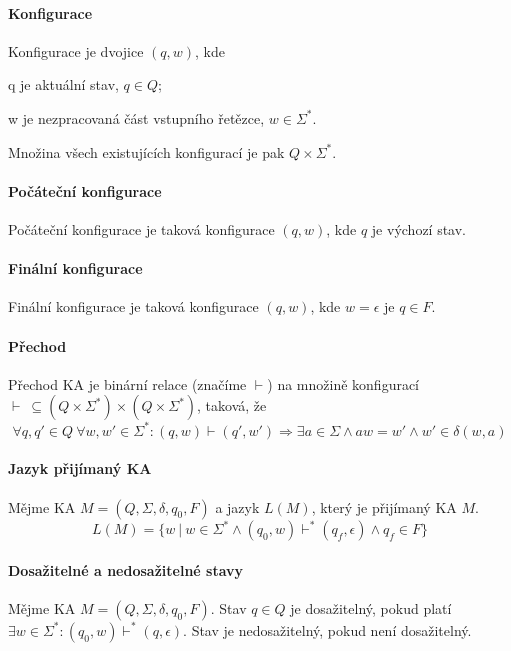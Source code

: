 \paragraph*{Konfigurace} Konfigurace je dvojice $(q, w)$, kde \begin{compactitem}
    \item q je aktuální stav, $q \in Q$;
    \item w je nezpracovaná část vstupního řetězce, $w \in \Sigma^*$.
\end{compactitem}
Množina všech existujících konfigurací je pak $Q \times \Sigma^* $.

\paragraph*{Počáteční konfigurace} Počáteční konfigurace je taková konfigurace $(q, w)$, kde $q$ je výchozí stav.

\paragraph*{Finální konfigurace} Finální konfigurace je taková konfigurace $(q, w)$, kde $w = \epsilon$ je $q \in F$.

\paragraph*{Přechod} Přechod KA je binární relace (značíme $\vdash$) na množině konfigurací $\vdash ~ \subseteq (Q \times \Sigma^*) \times (Q \times \Sigma^*)$, taková, že $$ \forall q, q' \in Q ~ \forall w, w' \in \Sigma^* : (q, w) \vdash (q', w') \Rightarrow  \exists a \in \Sigma \land aw = w' \land w' \in \delta(w, a)$$

\paragraph*{Jazyk přijímaný KA} Mějme KA $M = (Q, \Sigma, \delta, q_0, F)$ a jazyk $L(M)$, který je přijímaný KA $M$. $$ L(M) = \{ w ~|~ w \in \Sigma^* \land (q_0, w) \vdash^* (q_f, \epsilon) \land q_f \in F \}$$

\paragraph*{Dosažitelné a nedosažitelné stavy} Mějme KA $M = (Q, \Sigma, \delta, q_0, F)$. Stav $q \in Q$ je dosažitelný, pokud platí $\exists w \in \Sigma^* : (q_0, w) \vdash^* (q, \epsilon)$. Stav je nedosažitelný, pokud není dosažitelný.


